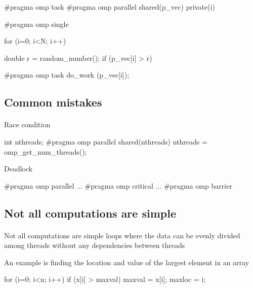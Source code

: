 \documentclass[%
oneside,                 %
final,                   %
10pt]{article}
\begin{document}
\bcppcod
#pragma omp task 
#pragma omp parallel shared(p_vec) private(i)
{
#pragma omp single
{
for (i=0; i<N; i++) {
  double r = random_number();
  if (p_vec[i] > r) {
#pragma omp task
   do_work (p_vec[i]);

\ecppcod



\subsection{Common mistakes}

\paragraph{}
Race condition






\bcppcod
int nthreads;
#pragma omp parallel shared(nthreads)
{
nthreads = omp_get_num_threads();
}

\ecppcod

Deadlock










\bcppcod
#pragma omp parallel
{
...
#pragma omp critical
{
...
#pragma omp barrier
}
}

\ecppcod



\subsection{Not all computations are simple}

\paragraph{}
Not all computations are simple loops where the data can be evenly 
divided among threads without any dependencies between threads

An example is finding the location and value of the largest element in an array







\bcppcod
for (i=0; i<n; i++) { 
   if (x[i] > maxval) {
      maxval = x[i];
      maxloc = i; 
   }
}

}}}}
\end{document}
